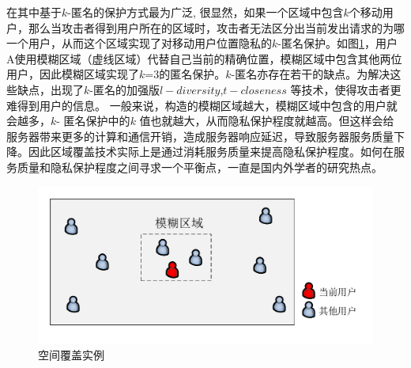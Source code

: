 在其中基于$k$-匿名的保护方式最为广泛\cite{Bamba}\cite{Mokbel}\cite{wang2010device}\cite{pan2012protecting}, 很显然，如果一个区域中包含$k$个移动用户，那么当攻击者得到用户所在的区域时，攻击者无法区分出当前发出请求的为哪一个用户，从而这个区域实现了对移动用户位置隐私的$k$-匿名保护。如图\ref{fig:cloaking_pdf}，用户A使用模糊区域（虚线区域）代替自己当前的精确位置，模糊区域中包含其他两位用户，因此模糊区域实现了$k$=3的匿名保护。$k$-匿名亦存在若干的缺点\cite{juncheng2014potential}。为解决这些缺点，出现了$k$-匿名的加强版$l-diversity$\cite{machanavajjhala2007diversity},$t-closeness$\cite{li2007t} 等技术，使得攻击者更难得到用户的信息。 一般来说，构造的模糊区域越大，模糊区域中包含的用户就会越多，$k$- 匿名保护中的$k$ 值也就越大，从而隐私保护程度就越高。但这样会给服务器带来更多的计算和通信开销，造成服务器响应延迟，导致服务器服务质量下降。因此区域覆盖技术实际上是通过消耗服务质量来提高隐私保护程度。如何在服务质量和隐私保护程度之间寻求一个平衡点，一直是国内外学者的研究热点。
\begin{figure}[H]
\centering
\includegraphics[width=12cm]{fig/cloaking.pdf}
\caption{空间覆盖实例} %
\label{fig:cloaking_pdf}
\end{figure}


